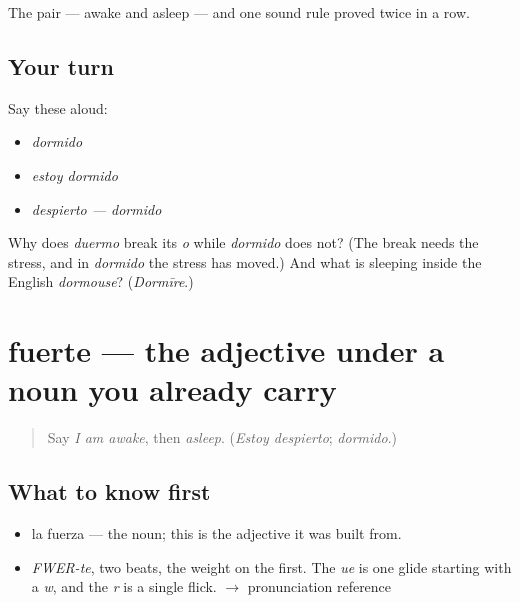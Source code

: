 \begin{grammarlens}[title={What you've built}]
The pair — awake and asleep — and one sound rule proved twice in a row.
\end{grammarlens}

\subsection*{Your turn}
Say these aloud:

\begin{itemize}
\raggedright
  \item \emph{dormido}
  \item \emph{estoy dormido}
  \item \emph{despierto — dormido}
\end{itemize}

\begin{tcolorbox}[breakable,colback=teal!4,colframe=teal!35!black,title={Before you move on}]
Why does \emph{duermo} break its \emph{o} while \emph{dormido} does not? (The break needs the stress, and in \emph{dormido} the stress has moved.) And what is sleeping inside the English \emph{dormouse}? (\emph{Dormīre}.)
\end{tcolorbox}
\section[fuerte]{fuerte — the adjective under a noun you already carry}

\label{lesson:ES-C327-fuerte}



\begin{quote}
Say \emph{I am awake}, then \emph{asleep}. (\emph{Estoy despierto}; \emph{dormido}.)
\end{quote}

\subsection*{What to know first}
\begin{itemize}
\raggedright
  \item la fuerza — the noun; this is the adjective it was built from.
\end{itemize}

\begin{sounds}
\begin{itemize}
\raggedright
  \item \emph{FWER-te}, two beats, the weight on the first. The \emph{ue} is one glide starting with a \emph{w}, and the \emph{r} is a single flick. $\to$ pronunciation reference
\end{itemize}
\end{sounds}

